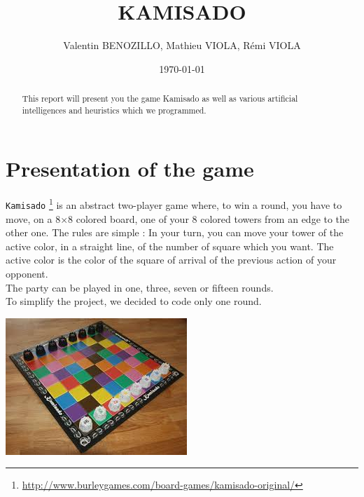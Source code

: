 \documentclass[a4paper, 11pt]{article}
\title{KAMISADO}
\author{Valentin BENOZILLO, Mathieu VIOLA, Rémi VIOLA}
\date{\today}
\begin{document}
\maketitle

\begin{abstract}
This report will present you the game Kamisado as well as various artificial intelligences and heuristics which we programmed.
\end{abstract}

\newpage

\tableofcontents

\newpage

\section{Presentation of the game}
\verb?Kamisado? \footnote{\url{http://www.burleygames.com/board-games/kamisado-original/}} is an abstract two-player game where, to win a round, you have to move, on a 8$\times$8 colored board, one of your 8 colored towers from an edge to the other one. The rules are simple : In your turn, you can move your tower of the active color, in a straight line, of the number of square which you want. The active color is the color of the square of arrival of the previous action of your opponent.\\
The party can be played in one, three, seven or fifteen rounds.\\
To simplify the project, we decided to code only one round.
\begin{center}
\includegraphics[scale = 0.8]{kamisado.jpeg}
\end{center}
\end{document}
